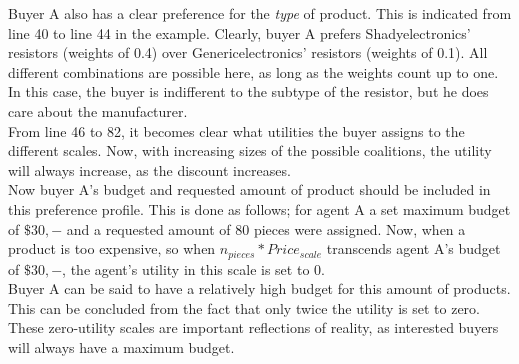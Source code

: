     Buyer A also has a clear preference for the \textit{type} of product. This is indicated from line 40 to line 44 in the example. Clearly, buyer A prefers Shadyelectronics' resistors (weights of 0.4) over Genericelectronics' resistors (weights of 0.1). All different combinations are possible here, as long as the weights count up to one. In this case, the buyer is indifferent to the subtype of the resistor, but he does care about the manufacturer. \\
    
    From line 46 to 82, it becomes clear what utilities the buyer assigns to the different scales. Now, with increasing sizes of the possible coalitions, the utility will always increase, as the discount increases. \\
    
    Now buyer A's budget and requested amount of product should be included in this preference profile. This is done as follows; for agent A a set maximum budget of $\$30,-$ and a requested amount of 80 pieces were assigned. Now, when a product is too expensive, so when $n_{pieces} * Price_{scale}$ transcends agent A's budget of $\$30,-$, the agent's utility in this scale is set to 0. \\ 
    
    Buyer A can be said to have a relatively high budget for this amount of products. This can be concluded from the fact that only twice the utility is set to zero. These zero-utility scales are important reflections of reality, as interested buyers will always have a maximum budget.  
    

